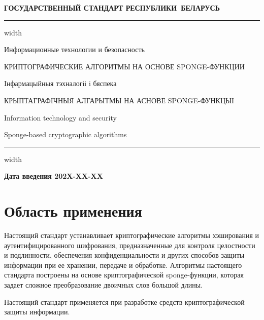 \newpage
\setcounter{page}{1}
\pagestyle{headings}

\begin{center}
{\bfseries
ГОСУДАРСТВЕННЫЙ СТАНДАРТ РЕСПУБЛИКИ~БЕЛАРУСЬ
\vskip 2pt
\hrule width\textwidth

\vskip 9pt

Информационные технологии и безопасность

КРИПТОГРАФИЧЕСКИЕ АЛГОРИТМЫ НА ОСНОВЕ SPONGE-ФУНКЦИИ

\vskip 9pt

Iнфармацыйныя тэхналогii i бяспека

КРЫПТАГРАФIЧНЫЯ АЛГАРЫТМЫ НА АСНОВЕ SPONGE-ФУНКЦЫІ
} %

\vskip 9pt

Information technology and security

Sponge-based cryptographic algorithms

\vskip 4pt                
\hrule width \textwidth
\end{center}

\mbox{}\hfill{\bfseries Дата введения 202X-XX-XX}

\chapter{Область применения}

Настоящий стандарт устанавливает криптографические алгоритмы хэширования
и аутентифицированного шифрования, предназначенные для контроля 
целостности и подлинности, обеспечения конфиденциальности и других способов 
защиты информации при ее хранении, передаче и обработке. 
%
Алгоритмы настоящего стандарта построены на основе криптографической 
sponge-функции, которая задает сложное преобразование двоичных слов большой 
длины.

Настоящий стандарт применяется при разработке 
средств криптографической защиты информации.

